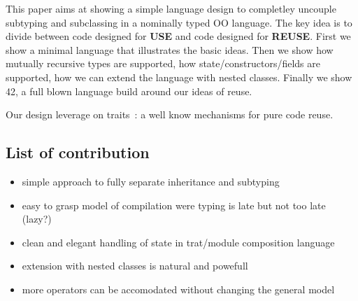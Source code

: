 This paper aims at showing a simple language design to completley uncouple subtyping
and subclassing in a nominally typed OO language. The key idea is to
divide between code designed for \textbf{USE}
and code designed for \textbf{REUSE}.
First we show a minimal language that illustrates the basic ideas. 
Then we show how mutually recursive types
are supported, how state/constructors/fields are supported,
how we can extend the language with nested classes.
Finally we show 42, a full blown language build around our ideas of
reuse.

Our design leverage on traits~\cite{ducasse2006traits}: a well know mechanisms for pure
code reuse.


\subsection{List of contribution}
\begin{itemize}
\item simple approach to fully separate inheritance and subtyping
\item easy to grasp model of compilation were typing is late but not
  too late (lazy?)
\item clean and elegant handling of state in trat/module composition language
\item extension with nested classes is natural and
  powefull
\item more operators can be accomodated without changing the general model
\end{itemize}
